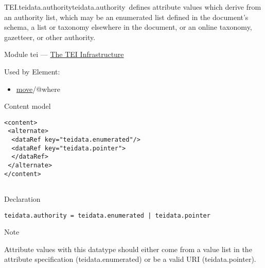\begin{reflist}
\item[]\begin{specHead}{TEI.teidata.authority}{teidata.authority} defines attribute values which derive from an authority list, which may be an enumerated list defined in the document's schema, a list or taxonomy elsewhere in the document, or an online taxonomy, gazetteer, or other authority.\end{specHead} 
    \item[{Module}]
  tei — \hyperref[ST]{The TEI Infrastructure}
    \item[{Used by}]
  Element: \begin{itemize}
\item \hyperref[TEI.move]{move}/@where
\end{itemize} 
    \item[{Content model}]
  \mbox{}\hfill\\[-10pt]\begin{Verbatim}[fontsize=\small]
<content>
 <alternate>
  <dataRef key="teidata.enumerated"/>
  <dataRef key="teidata.pointer">  
  </dataRef>
 </alternate>
</content>
    
\end{Verbatim}

    \item[{Declaration}]
  \mbox{}\hfill\\[-10pt]\begin{Verbatim}[fontsize=\small]
teidata.authority = teidata.enumerated | teidata.pointer
\end{Verbatim}

    \item[{Note}]
  \par
Attribute values with this datatype should either come from a value list in the attribute specification (\textsf{teidata.enumerated}) or be a valid URI (\textsf{teidata.pointer}).
\end{reflist}  
